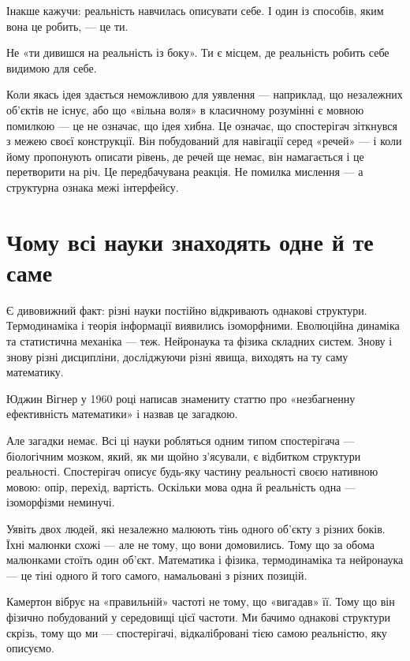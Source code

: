 \documentclass[12pt, a4paper, openany]{book}
\begin{document}
Інакше кажучи: реальність навчилась описувати себе. І один із способів, яким вона це робить, --- це ти.

Не «ти дивишся на реальність із боку». Ти є місцем, де реальність робить себе видимою для себе.

Коли якась ідея здається неможливою для уявлення --- наприклад, що незалежних об'єктів не існує, або що «вільна воля» в класичному розумінні є мовною помилкою --- це не означає, що ідея хибна. Це означає, що спостерігач зіткнувся з межею своєї конструкції. Він побудований для навігації серед «речей» --- і коли йому пропонують описати рівень, де речей ще немає, він намагається і це перетворити на річ. Це передбачувана реакція. Не помилка мислення --- а структурна ознака межі інтерфейсу.

\section{Чому всі науки знаходять одне й те саме}

Є дивовижний факт: різні науки постійно відкривають однакові структури. Термодинаміка і теорія інформації виявились ізоморфними. Еволюційна динаміка та статистична механіка --- теж. Нейронаука та фізика складних систем. Знову і знову різні дисципліни, досліджуючи різні явища, виходять на ту саму математику.

Юджин Вігнер у 1960 році написав знамениту статтю про «незбагненну ефективність математики» і назвав це загадкою.

Але загадки немає. Всі ці науки робляться одним типом спостерігача --- біологічним мозком, який, як ми щойно з'ясували, є відбитком структури реальності. Спостерігач описує будь-яку частину реальності своєю нативною мовою: опір, перехід, вартість. Оскільки мова одна й реальність одна --- ізоморфізми неминучі.

\begin{analogybox}
Уявіть двох людей, які незалежно малюють тінь одного об'єкту з різних боків. Їхні малюнки схожі --- але не тому, що вони домовились. Тому що за обома малюнками стоїть один об'єкт. Математика і фізика, термодинаміка та нейронаука --- це тіні одного й того самого, намальовані з різних позицій.
\end{analogybox}

Камертон вібрує на «правильній» частоті не тому, що «вигадав» її. Тому що він фізично побудований у середовищі цієї частоти. Ми бачимо однакові структури скрізь, тому що ми --- спостерігачі, відкалібровані тією самою реальністю, яку описуємо.
\end{document}
